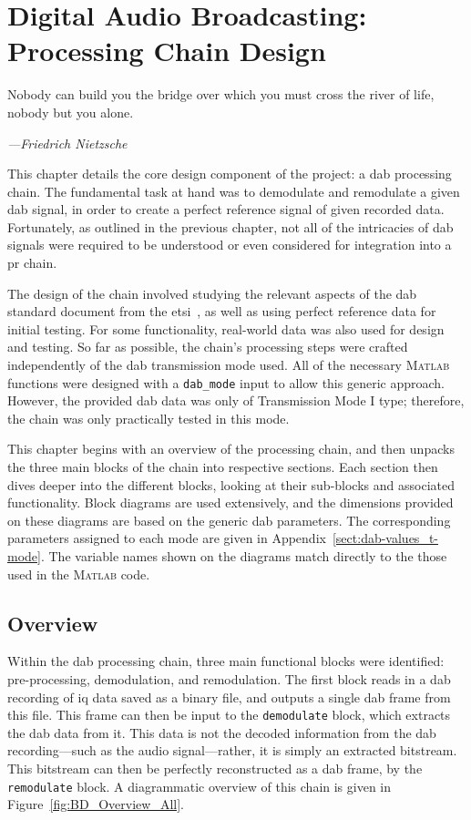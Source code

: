 \documentclass[class=report,11pt,crop=false]{standalone}
\begin{document}
\ifstandalone
\tableofcontents
\fi
\chapter{Digital Audio Broadcasting: Processing Chain Design \label{ch:dab-processing}}
\epigraph{Nobody can build you the bridge over which you must cross the river of life, nobody but you alone.}%
    {\emph{---Friedrich Nietzsche}}
\vspace{0.5cm}

This chapter details the core design component of the project: a \gls{dab} processing chain. The fundamental task at hand was to demodulate and remodulate a given \gls{dab} signal, in order to create a perfect reference signal of given recorded data. Fortunately, as outlined in the previous chapter, not all of the intricacies of \gls{dab} signals were required to be understood or even considered for integration into a \gls{pr} chain.

The design of the chain involved studying the relevant aspects of the \gls{dab} standard document from the \gls{etsi}~\cite{dabstandard}, as well as using perfect reference data for initial testing. For some functionality, real-world data was also used for design and testing. So far as possible, the chain's processing steps were crafted independently of the \gls{dab} transmission mode used. All of the necessary \textsc{Matlab} functions were designed with a \texttt{dab\_mode} input to allow this generic approach. However, the provided \gls{dab} data was only of Transmission Mode I type; therefore, the chain was only practically tested in this mode.

This chapter begins with an overview of the processing chain, and then unpacks the three main blocks of the chain into respective sections. Each section then dives deeper into the different blocks, looking at their sub-blocks and associated functionality. Block diagrams are used extensively, and the dimensions provided on these diagrams are based on the generic \gls{dab} parameters. The corresponding parameters assigned to each mode are given in Appendix~\ref{sect:dab-values_t-mode}. The variable names shown on the diagrams match directly to the those used in the \textsc{Matlab} code.

\section{Overview}
Within the \gls{dab} processing chain, three main functional blocks were identified: pre-processing, demodulation, and remodulation. The first block reads in a \gls{dab} recording of \gls{iq} data saved as a binary file, and outputs a single \gls{dab} frame from this file. This frame can then be input to the \texttt{demodulate} block, which extracts the \gls{dab} data from it. This data is not the decoded information from the \gls{dab} recording---such as the audio signal---rather, it is simply an extracted bitstream. This bitstream can then be perfectly reconstructed as a \gls{dab} frame, by the \texttt{remodulate} block. A diagrammatic overview of this chain is given in Figure~\ref{fig:BD_Overview_All}.
\end{document}
